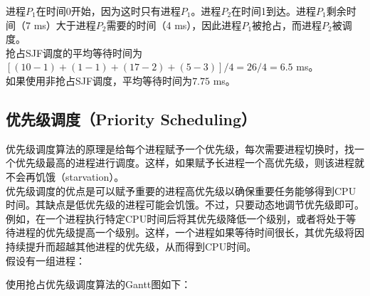进程$ P_1 $在时间0开始，因为这时只有进程$ P_1 $。进程$ P_2 $在时间1到达。进程$ P_1 $剩余时间（7 ms）大于进程$ P_2 $需要的时间（4 ms），因此进程$ P_1 $被抢占，而进程$ P_2 $被调度。 \\

抢占SJF调度的平均等待时间为$ [(10-1) + (1-1) + (17-2) + (5-3)] / 4 = 26 / 4 = 6.5$ ms。 \\

如果使用非抢占SJF调度，平均等待时间为$ 7.75 $ ms。

\subsection{优先级调度（Priority Scheduling）}

优先级调度算法的原理是给每个进程赋予一个优先级，每次需要进程切换时，找一个优先级最高的进程进行调度。这样，如果赋予长进程一个高优先级，则该进程就不会再饥饿（starvation）。 \\

优先级调度的优点是可以赋予重要的进程高优先级以确保重要任务能够得到CPU时间。其缺点是低优先级的进程可能会饥饿。不过，只要动态地调节优先级即可。例如，在一个进程执行特定CPU时间后将其优先级降低一个级别，或者将处于等待进程的优先级提高一个级别。这样，一个进程如果等待时间很长，其优先级将因持续提升而超越其他进程的优先级，从而得到CPU时间。 \\

假设有一组进程：

\begin{table}[H]
	\centering
\end{table}

使用抢占优先级调度算法的Gantt图如下：

